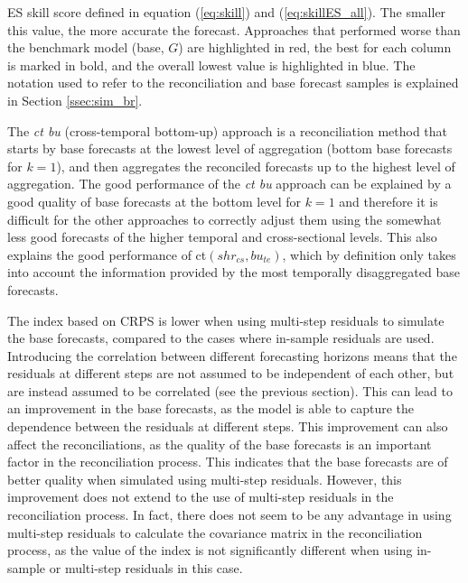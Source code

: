 \documentclass[a4paper,11pt]{article}
\theoremstyle{definition}
\begin{document}
\begin{table}[p]
\centering
\begingroup
{}
\fontsize{9}{11}\selectfont

\endgroup
\caption{ES skill score defined in equation (\ref{eq:skill}) and (\ref{eq:skillES_all}). The smaller this value, the more accurate the forecast. Approaches that performed worse than the benchmark model (base, $G$) are highlighted in red, the best for each column is marked in bold, and the overall lowest value is highlighted in blue. The notation used to refer to the reconciliation and base forecast samples is explained in Section \ref{ssec:sim_br}.}
\label{tab:ar2es}
\end{table}

The \textit{ct bu} (cross-temporal bottom-up) approach is a reconciliation method that starts by base forecasts at the lowest level of aggregation (bottom base forecasts for $k = 1$), and then aggregates the reconciled forecasts up to the highest level of aggregation. The good performance of the \textit{ct bu} approach can be explained by a good quality of base forecasts at the bottom level for $k=1$ and therefore it is difficult for the other approaches to correctly adjust them using the somewhat less good forecasts of the higher temporal and cross-sectional levels. This also explains the good performance of ct$(shr_{cs}, bu_{te})$, which by definition only takes into account the information provided by the most temporally disaggregated base forecasts.

The index based on CRPS is lower when using multi-step residuals to simulate the base forecasts, compared to the cases where in-sample residuals are used. Introducing the correlation between different forecasting horizons means that the residuals at different steps are not assumed to be independent of each other, but are instead assumed to be correlated (see the previous section). This can lead to an improvement in the base forecasts, as the model is able to capture the dependence between the residuals at different steps. This improvement can also affect the reconciliations, as the quality of the base forecasts is an important factor in the reconciliation process. This indicates that the base forecasts are of better quality when simulated using multi-step residuals. However, this improvement does not extend to the use of multi-step residuals in the reconciliation process. In fact, there does not seem to be any advantage in using multi-step residuals to calculate the covariance matrix in the reconciliation process, as the value of the index is not significantly different when using in-sample or multi-step residuals in this case.
\end{document}
